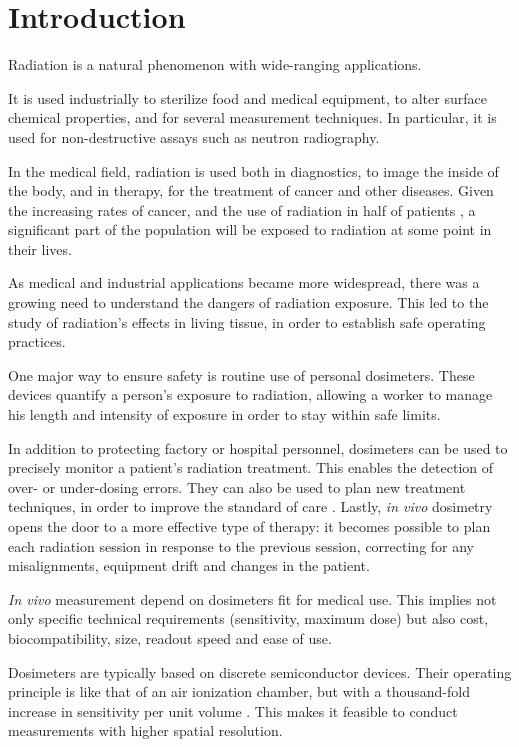 \section{Introduction}
Radiation is a natural phenomenon with wide-ranging applications.

It is used industrially to sterilize food and medical equipment,
to alter surface chemical properties\cite{clough2001high},
and for several measurement techniques.
In particular, it is used for non-destructive assays such as
neutron radiography\cite{berger_neutron_1960}.

In the medical field, radiation is used both in diagnostics,
to image the inside of the body,
and in therapy, for the treatment of cancer and other diseases.
Given the increasing rates of cancer,
and the use of radiation in half of patients
\cite{symposium_assurance_dosimetry_1994},
a significant part of the population will be exposed to radiation
at some point in their lives.

As medical and industrial applications became more widespread,
there was a growing need to understand the dangers of radiation exposure.
This led to the study of radiation's effects in living tissue,
in order to establish safe operating practices.

One major way to ensure safety is routine use of personal dosimeters.
These devices quantify a person's exposure to radiation,
allowing a worker to manage his length and intensity of exposure
in order to stay within safe limits.

In addition to protecting factory or hospital personnel,
dosimeters can be used to precisely monitor a patient's radiation treatment.
This enables the detection of over- or under-dosing errors\cite{noel_detection_1995}.
They can also be used to plan new treatment techniques,
in order to improve the standard of care
\cite{essers_vivo_1999}.
Lastly, \emph{in vivo} dosimetry
opens the door to a more effective type of therapy:
it becomes possible to plan each radiation session
in response to the previous session,
correcting for any misalignments,
equipment drift and changes in the patient\cite{wu_application_2006}.

\emph{In vivo} measurement depend on dosimeters fit for medical use.
This implies not only specific technical requirements
(sensitivity, maximum dose)
but also cost, biocompatibility, size, readout speed and ease of use.

Dosimeters are typically based on discrete semiconductor devices.
Their operating principle is like that of an air ionization chamber,
but with a thousand-fold increase in sensitivity per unit volume
\cite{jones_application_1963}.
This makes it feasible to conduct measurements with higher spatial resolution.

